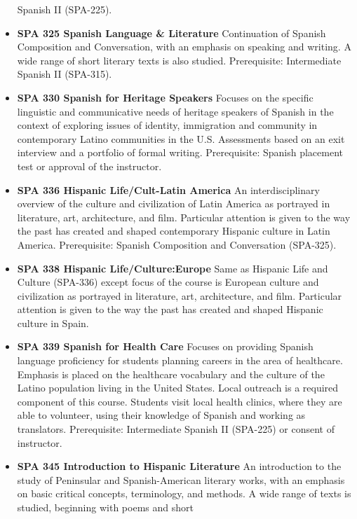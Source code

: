 \documentclass[
  letterpaper,
]{scrbook}
\begin{document}
\begin{itemize}
  Spanish II (SPA-225).\\
\item
  \textbf{SPA 325 Spanish Language \& Literature} Continuation of
  Spanish Composition and Conversation, with an emphasis on speaking and
  writing. A wide range of short literary texts is also studied.
  Prerequisite: Intermediate Spanish II (SPA-315).
\item
  \textbf{SPA 330 Spanish for Heritage Speakers} Focuses on the specific
  linguistic and communicative needs of heritage speakers of Spanish in
  the context of exploring issues of identity, immigration and community
  in contemporary Latino communities in the U.S. Assessments based on an
  exit interview and a portfolio of formal writing. Prerequisite:
  Spanish placement test or approval of the instructor.\\
\item
  \textbf{SPA 336 Hispanic Life/Cult-Latin America} An interdisciplinary
  overview of the culture and civilization of Latin America as portrayed
  in literature, art, architecture, and film. Particular attention is
  given to the way the past has created and shaped contemporary Hispanic
  culture in Latin America. Prerequisite: Spanish Composition and
  Conversation (SPA-325).
\item
  \textbf{SPA 338 Hispanic Life/Culture:Europe} Same as Hispanic Life
  and Culture (SPA-336) except focus of the course is European culture
  and civilization as portrayed in literature, art, architecture, and
  film. Particular attention is given to the way the past has created
  and shaped Hispanic culture in Spain.\\
\item
  \textbf{SPA 339 Spanish for Health Care} Focuses on providing Spanish
  language proficiency for students planning careers in the area of
  healthcare. Emphasis is placed on the healthcare vocabulary and the
  culture of the Latino population living in the United States. Local
  outreach is a required component of this course. Students visit local
  health clinics, where they are able to volunteer, using their
  knowledge of Spanish and working as translators. Prerequisite:
  Intermediate Spanish II (SPA-225) or consent of instructor.
\item
  \textbf{SPA 345 Introduction to Hispanic Literature} An introduction
  to the study of Peninsular and Spanish-American literary works, with
  an emphasis on basic critical concepts, terminology, and methods. A
  wide range of texts is studied, beginning with poems and short

\end{itemize}
\end{document}
